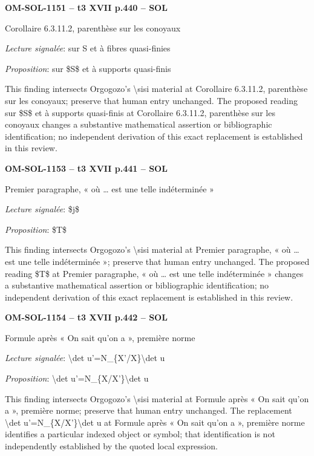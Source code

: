 \par\noindent\textbf{OM-SOL-1151 -- t3 XVII p.440 -- SOL}\par
Corollaire 6.3.11.2, parenthèse sur les conoyaux\par
\emph{Lecture signalée}: sur S et à fibres quasi-finies\par
\emph{Proposition}: sur \$S\$ et à supports quasi-finis\par
This finding intersects Orgogozo's \textbackslash{}sisi material at Corollaire 6.3.11.2, parenthèse sur les conoyaux; preserve that human entry unchanged. The proposed reading sur \$S\$ et à supports quasi-finis at Corollaire 6.3.11.2, parenthèse sur les conoyaux changes a substantive mathematical assertion or bibliographic identification; no independent derivation of this exact replacement is established in this review.\par
\par\noindent\textbf{OM-SOL-1153 -- t3 XVII p.441 -- SOL}\par
Premier paragraphe, « où … est une telle indéterminée »\par
\emph{Lecture signalée}: \$j\$\par
\emph{Proposition}: \$T\$\par
This finding intersects Orgogozo's \textbackslash{}sisi material at Premier paragraphe, « où … est une telle indéterminée »; preserve that human entry unchanged. The proposed reading \$T\$ at Premier paragraphe, « où … est une telle indéterminée » changes a substantive mathematical assertion or bibliographic identification; no independent derivation of this exact replacement is established in this review.\par
\par\noindent\textbf{OM-SOL-1154 -- t3 XVII p.442 -- SOL}\par
Formule après « On sait qu'on a », première norme\par
\emph{Lecture signalée}: \textbackslash{}det u'=\allowbreak N\_\{X'/X\}\textbackslash{}det u\par
\emph{Proposition}: \textbackslash{}det u'=\allowbreak N\_\{X/X'\}\textbackslash{}det u\par
This finding intersects Orgogozo's \textbackslash{}sisi material at Formule après « On sait qu'on a », première norme; preserve that human entry unchanged. The replacement \textbackslash{}det u'=\allowbreak N\_\{X/X'\}\textbackslash{}det u at Formule après « On sait qu'on a », première norme identifies a particular indexed object or symbol; that identification is not independently established by the quoted local expression.\par
